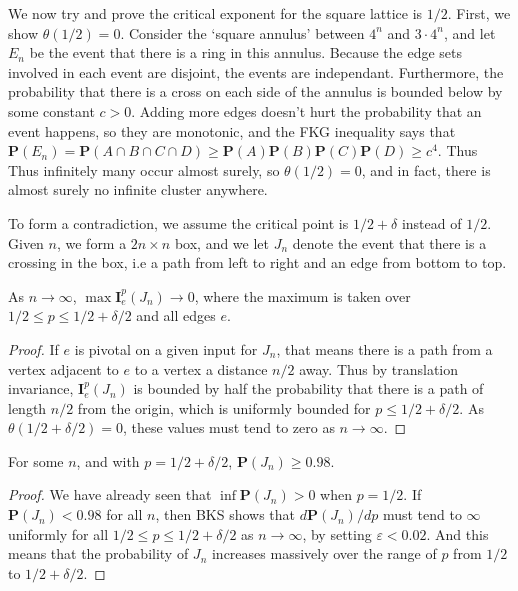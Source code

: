 We now try and prove the critical exponent for the square lattice is $1/2$. First, we show $\theta(1/2) = 0$. Consider the `square annulus' between $4^n$ and $3 \cdot 4^n$, and let $E_n$ be the event that there is a ring in this annulus. Because the edge sets involved in each event are disjoint, the events are independant. Furthermore, the probability that there is a cross on each side of the annulus is bounded below by some constant $c > 0$. Adding more edges doesn't hurt the probability that an event happens, so they are monotonic, and the FKG inequality says that $\mathbf{P}(E_n) = \mathbf{P}(A \cap B \cap C \cap D) \geq \mathbf{P}(A) \mathbf{P}(B) \mathbf{P}(C) \mathbf{P}(D) \geq c^4$. Thus Thus infinitely many occur almost surely, so $\theta(1/2) = 0$, and in fact, there is almost surely no infinite cluster anywhere.

To form a contradiction, we assume the critical point is $1/2 + \delta$ instead of $1/2$. Given $n$, we form a $2n \times n$ box, and we let $J_n$ denote the event that there is a crossing in the box, i.e a path from left to right and an edge from bottom to top.

\begin{lemma}
    As $n \to \infty$, $\max \mathbf{I}_e^{p}(J_n) \to 0$, where the maximum is taken over $1/2 \leq p \leq 1/2 + \delta/2$ and all edges $e$.
\end{lemma}
\begin{proof}
    If $e$ is pivotal on a given input for $J_n$, that means there is a path from a vertex adjacent to $e$ to a vertex a distance $n/2$ away. Thus by translation invariance, $\mathbf{I}_e^p(J_n)$ is bounded by half the probability that there is a path of length $n/2$ from the origin, which is uniformly bounded for $p \leq 1/2 + \delta/2$. As $\theta(1/2 + \delta/2) = 0$, these values must tend to zero as $n \to \infty$.
\end{proof}

\begin{lemma}
    For some $n$, and with $p = 1/2 + \delta/2$, $\mathbf{P}(J_n) \geq 0.98$.
\end{lemma}
\begin{proof}
    We have already seen that $\inf \mathbf{P}(J_n) > 0$ when $p = 1/2$. If $\mathbf{P}(J_n) < 0.98$ for all $n$, then BKS shows that $d\mathbf{P}(J_n)/dp$ must tend to $\infty$ uniformly for all $1/2 \leq p \leq 1/2 + \delta/2$ as $n \to \infty$, by setting $\varepsilon < 0.02$. And this means that the probability of $J_n$ increases massively over the range of $p$ from $1/2$ to $1/2 + \delta/2$.
\end{proof}

